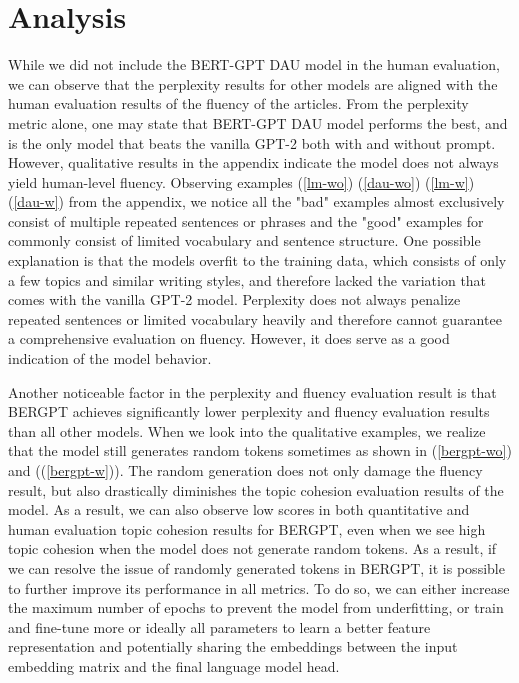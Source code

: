 \documentclass{article}
\begin{document}



\section{Analysis}

While we did not include the BERT-GPT DAU model in the human evaluation, we can observe that the perplexity results for other models are aligned with the human evaluation results of the fluency of the articles. From the perplexity metric alone, one may state that BERT-GPT DAU model performs the best, and is the only model that beats the vanilla GPT-2 both with and without prompt. However, qualitative results in the appendix indicate the model does not always yield human-level fluency. Observing examples (\ref{lm-wo}) (\ref{dau-wo}) (\ref{lm-w}) (\ref{dau-w}) from the appendix, we notice all the "bad" examples almost exclusively consist of multiple repeated sentences or phrases and the "good" examples for commonly consist of limited vocabulary and sentence structure.
One possible explanation is that the models overfit to the training data, which consists of only a few topics and similar writing styles, and therefore lacked the variation that comes with the vanilla GPT-2 model.
Perplexity does not always penalize repeated sentences or limited vocabulary heavily and therefore cannot guarantee a comprehensive evaluation on fluency. However, it does serve as a good indication of the model behavior.

Another noticeable factor in the perplexity and fluency evaluation result is that BERGPT achieves significantly lower perplexity and fluency evaluation results than all other models. When we look into the qualitative examples, we realize that the model still generates random tokens sometimes as shown in (\ref{bergpt-wo}) and ((\ref{bergpt-w})). The random generation does not only damage the fluency result, but also drastically diminishes the topic cohesion evaluation results of the model. As a result, we can also observe low scores in both quantitative and human evaluation topic cohesion results for BERGPT, even when we see high topic cohesion when the model does not generate random tokens. As a result, if we can resolve the issue of randomly generated tokens in BERGPT, it is possible to further improve its performance in all metrics. To do so, we can either increase the maximum number of epochs to prevent the model from underfitting, or train and fine-tune more or ideally all parameters to learn a better feature representation and potentially sharing the embeddings between the input embedding matrix and the final language model head.
\end{document}
